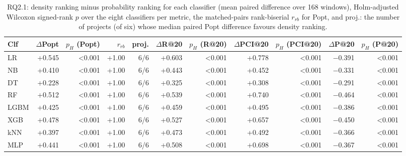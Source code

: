 \begin{table}[t]
\centering
\footnotesize
\caption{RQ2.1: density ranking minus probability ranking for each classifier (mean paired difference over 168 windows), Holm-adjusted Wilcoxon signed-rank $p$ over the eight classifiers per metric, the matched-pairs rank-biserial $r_{rb}$ for Popt, and proj.: the number of projects (of six) whose median paired Popt difference favours density ranking.}
\label{tab:p2-rq1}
\begin{adjustbox}{max width=\linewidth}
\begin{tabular}{lrrrrrrrrrr}
\toprule
Clf & $\Delta$Popt & $p_H$ (Popt) & $r_{rb}$ & proj. & $\Delta$R@20 & $p_H$ (R@20) & $\Delta$PCI@20 & $p_H$ (PCI@20) & $\Delta$P@20 & $p_H$ (P@20) \\
\midrule
LR & +0.545 & <0.001 & +1.00 & 6/6 & +0.603 & <0.001 & +0.778 & <0.001 & $-$0.391 & <0.001 \\
NB & +0.410 & <0.001 & +1.00 & 6/6 & +0.443 & <0.001 & +0.452 & <0.001 & $-$0.331 & <0.001 \\
DT & +0.228 & <0.001 & +1.00 & 6/6 & +0.325 & <0.001 & +0.308 & <0.001 & $-$0.291 & <0.001 \\
RF & +0.512 & <0.001 & +1.00 & 6/6 & +0.539 & <0.001 & +0.740 & <0.001 & $-$0.464 & <0.001 \\
LGBM & +0.425 & <0.001 & +1.00 & 6/6 & +0.459 & <0.001 & +0.495 & <0.001 & $-$0.386 & <0.001 \\
XGB & +0.478 & <0.001 & +1.00 & 6/6 & +0.527 & <0.001 & +0.657 & <0.001 & $-$0.450 & <0.001 \\
kNN & +0.397 & <0.001 & +1.00 & 6/6 & +0.473 & <0.001 & +0.492 & <0.001 & $-$0.366 & <0.001 \\
MLP & +0.441 & <0.001 & +1.00 & 6/6 & +0.508 & <0.001 & +0.698 & <0.001 & $-$0.367 & <0.001 \\
\bottomrule
\end{tabular}
\end{adjustbox}
\end{table}


